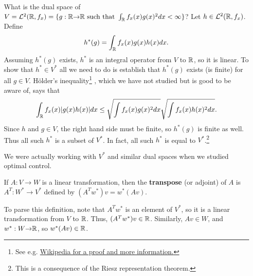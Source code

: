 \begin{example}
  What is the dual space of $V = \mathcal{L}^2(\mathbb{R},f_x) = \{g:
  \mathbb{R} {\rightarrow} \mathbb{R} \text{ such that } \int_{\mathbb{R}} f_x(x) g(x)^2 dx <
  \infty\}$? Let $h \in \mathcal{L}^2(\mathbb{R},f_x)$. Define 
  \[ h^\ast(g) = \int_{\mathbb{R}} f_x(x) g(x) h(x) dx. \]
  Assuming $h^\ast(g)$ exists, $h^\ast$ is an integral operator from
  $V$ to $\mathbb{R}$, so it is linear. To show that $h^\ast \in V^\ast$ all
  we need to do is establish that $h^\ast(g)$ exists (is finite) for
  all $g \in V$.  H\"{o}lder's inequality\footnote{See e.g.
    \href{http://en.wikipedia.org/wiki/H\%C3\%B6lder\%27s_inequality}
    {Wikipedia for a proof and more information.}} , which we have not
  studied but is good to be aware of, says that
  \[ \int_{\mathbb{R}} f_x(x) |g(x) h(x)| dx \leq \sqrt{\int f_x(x) g(x)^2 dx}
  \sqrt{\int f_x(x) h(x)^2 dx}. \]
  Since $h$ and $g \in V$, the right hand side must be finite, so
  $h^\ast(g)$ is finite as well. Thus all such $h^\ast$ is a subset of
  $V^\ast$.   In fact, all such $h^\ast$ is equal to
  $V^\ast$.\footnote{This is a consequence of the Riesz representation
    theorem.}
 
  We were actually working with $V^\ast$ and similar dual spaces when
  we studied optimal control.
\end{example}
\begin{definition}
  If $A: V \to W$ is a linear transformation, then the
  \textbf{transpose} (or adjoint) of $A$ is $A^T: W^\ast \to V^\ast$
  defined by $(A^Tw^\ast)v = w^\ast(Av)$.
\end{definition}
To parse this definition, note that $A^T w^\ast$ is an element of
$V^\ast$, so it is a linear transformation from $V$ to $\mathbb{R}$. Thus,
$(A^T w^\ast) v \in \mathbb{R}$. Similarly, $Av \in W$, and $w^\ast: W {\rightarrow}
\mathbb{R}$, so $w^\ast (A v) \in \mathbb{R}$. 
